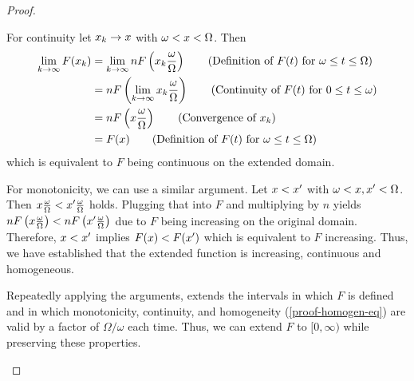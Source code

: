 \begin{proof}
\begin{proofpart}
		For continuity let $x_k \rightarrow x$ with $\omega < x < \Omega$. Then
		\begin{align*}
			\lim_{k \rightarrow \infty} F(\ta_k) & = \lim_{k \rightarrow \infty} n F \left ( \ta_k \frac{\omega}{\Omega} \right) \tag{Definition of $F(t)$ for $\omega \leq t \leq \Omega$} \\
			                                     & = n F \left ( \lim_{k \rightarrow \infty} \ta_k \frac{\omega}{\Omega} \right) \tag{Continuity of $F(t)$ for $0 \leq t \leq \omega$}      \\
			                                     & = n F \left ( \ta \frac{\omega}{\Omega} \right) \tag{Convergence of $\ta_k$}                                                             \\
			                                     & = F(\ta) \tag{Definition of $F(t)$ for $\omega \leq t \leq \Omega$}
		\end{align*}
		which is equivalent to $F$ being continuous on the extended domain.

		For monotonicity, we can use a similar argument. Let $x < x'$ with $\omega < x, x' < \Omega$. Then $x \frac{\omega}{\Omega} < x' \frac{\omega}{\Omega}$ holds. Plugging that into $F$ and multiplying by $n$ yields $nF \left(x \frac{\omega}{\Omega}\right) <nF \left( x' \frac{\omega}{\Omega}\right)$ due to $F$ being increasing on the original domain. Therefore, $x < x'$ implies $F(x) < F(x')$ which is equivalent to $F$ increasing.
		Thus, we have established that the extended function is increasing, continuous and homogeneous.

		Repeatedly applying the arguments, extends the intervals in which $F$ is defined and in which monotonicity, continuity, and homogeneity (\cref{proof-homogen-eq}) are valid by a factor of $\Omega/\omega$ each time. Thus, we can extend $F$ to $[0, \infty)$ while preserving these properties.


\end{proofpart}
\end{proof}
